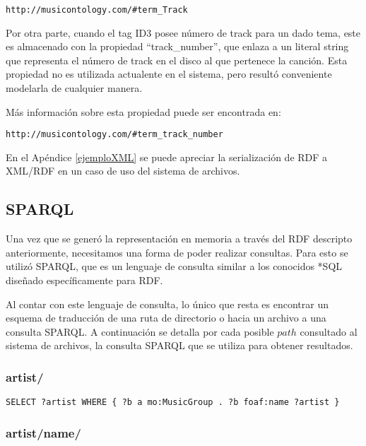 \documentclass[a4paper,oneside]{report}
\begin{document}
\begin{lstlisting}
http://musicontology.com/#term_Track
\end{lstlisting}

Por otra parte, cuando el tag ID3 posee número de track para un dado tema, este es almacenado con la propiedad ``track\_number'', que enlaza a un literal string que representa el número de track en el disco al que pertenece la canción. Esta propiedad no es utilizada actualente en el sistema, pero resultó conveniente modelarla de cualquier manera.

Más información sobre esta propiedad puede ser encontrada en:

\begin{lstlisting}
http://musicontology.com/#term_track_number
\end{lstlisting}

En el Apéndice \ref{ejemploXML} se puede apreciar la serialización de RDF a XML/RDF en un caso de uso del sistema de archivos.

\subsection{SPARQL}

Una vez que se generó la representación en memoria a través del RDF descripto anteriormente, necesitamos una forma de poder realizar consultas. Para esto se utilizó SPARQL, que es un lenguaje de consulta similar a los conocidos *SQL diseñado específicamente para RDF.

Al contar con este lenguaje de consulta, lo único que resta es encontrar un esquema de traducción de una ruta de directorio o hacia un archivo a una consulta SPARQL. A continuación se detalla por cada posible $path$ consultado al sistema de archivos, la consulta SPARQL que se utiliza para obtener resultados.

\subsubsection{artist/}

\begin{lstlisting}
SELECT ?artist WHERE { ?b a mo:MusicGroup . ?b foaf:name ?artist }
\end{lstlisting}

\subsubsection{artist/name/}
\end{document}
